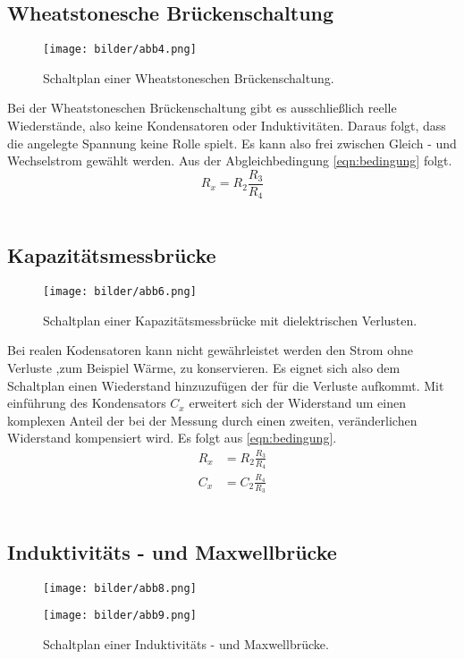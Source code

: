 \subsection{Wheatstonesche Brückenschaltung}
\begin{figure}
    \centering
    \texttt{[image: bilder/abb4.png]}
    \caption{Schaltplan einer Wheatstoneschen Brückenschaltung. \cite{skript}} 
    \label{fig:abb4}
\end{figure}
Bei der Wheatstoneschen Brückenschaltung gibt es ausschließlich reelle Wiederstände, also  keine Kondensatoren
oder Induktivitäten. Daraus folgt, dass die angelegte Spannung keine Rolle spielt. Es kann also frei zwischen
Gleich - und Wechselstrom gewählt werden. Aus der Abgleichbedingung \eqref{eqn:bedingung} folgt.
\begin{equation}
    R_x = R_2 \frac{R_3}{R_4}
\end{equation}
\\
\newline
\subsection{Kapazitätsmessbrücke}
\begin{figure}
    \centering
    \texttt{[image: bilder/abb6.png]}
    \caption{Schaltplan einer Kapazitätsmessbrücke mit dielektrischen Verlusten. \cite{skript}} 
    \label{fig:abb6}
\end{figure}
Bei realen Kodensatoren kann nicht gewährleistet werden den Strom ohne Verluste ,zum Beispiel Wärme, 
zu konservieren. Es eignet sich also dem Schaltplan einen Wiederstand hinzuzufügen der für die Verluste aufkommt.
Mit einführung des Kondensators $C_x$ erweitert sich der Widerstand um einen komplexen Anteil der bei der Messung durch 
einen zweiten, veränderlichen Widerstand kompensiert wird. 
Es folgt aus \eqref{eqn:bedingung}.
\begin{align}
    R_x &= R_2\frac{R_3}{R_4} \\
    C_x &= C_2\frac{R_4}{R_3}
\end{align}
\\
\newline
\subsection{Induktivitäts - und Maxwellbrücke }

\begin{figure}
\begin{minipage}[c]{0.5\textwidth}
    \centering
    \texttt{[image: bilder/abb8.png]}
    \label{fig:abb8}
\end{minipage}    
\begin{minipage}[c]{0.5\textwidth}
            \centering
        \texttt{[image: bilder/abb9.png]}
        \label{fig:abb9}
\end{minipage}
\caption{Schaltplan einer Induktivitäts - und Maxwellbrücke. \cite{skript}}
\end{figure}


